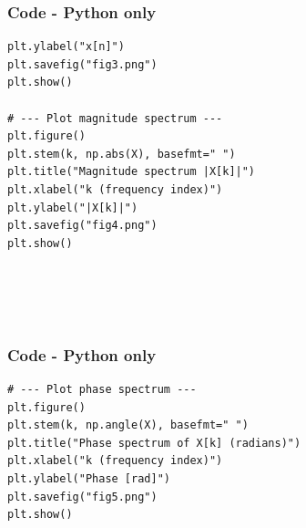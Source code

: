 \documentclass{beamer}
\theoremstyle{remark}
\numberwithin{equation}{section}
\begin{document}
\begin{frame}[fragile]
\frametitle{Code - Python only}
\begin{lstlisting}
plt.ylabel("x[n]")
plt.savefig("fig3.png")
plt.show()

# --- Plot magnitude spectrum ---
plt.figure()
plt.stem(k, np.abs(X), basefmt=" ")
plt.title("Magnitude spectrum |X[k]|")
plt.xlabel("k (frequency index)")
plt.ylabel("|X[k]|")
plt.savefig("fig4.png")
plt.show()





\end{lstlisting}
\end{frame}

\begin{frame}[fragile]
\frametitle{Code - Python only}
\begin{lstlisting}
# --- Plot phase spectrum ---
plt.figure()
plt.stem(k, np.angle(X), basefmt=" ")
plt.title("Phase spectrum of X[k] (radians)")
plt.xlabel("k (frequency index)")
plt.ylabel("Phase [rad]")
plt.savefig("fig5.png")
plt.show()




\end{lstlisting}
\end{frame}
\end{document}
